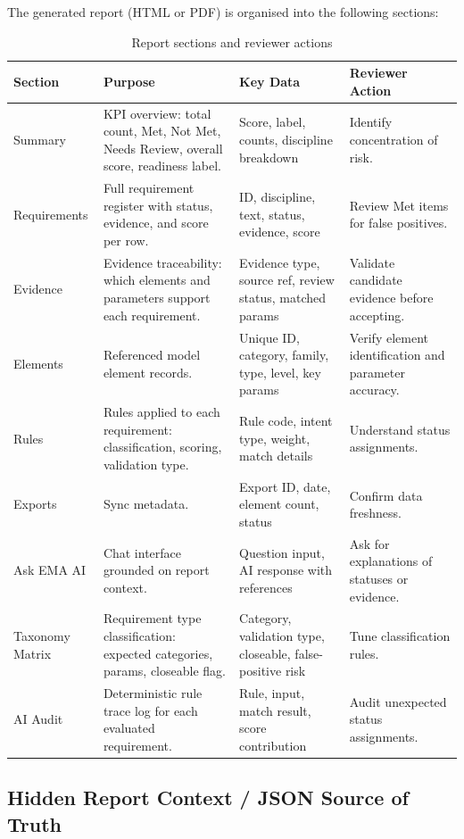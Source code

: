 \documentclass[10pt,letterpaper]{article}
\begin{document}
The generated report (HTML or PDF) is organised into the following sections:

\begin{longtable}{p{1.3in}p{1.6in}p{1.4in}p{2.0in}}
\caption{Report sections and reviewer actions}
\label{tab:report-sections}\\
\toprule
\textbf{Section} & \textbf{Purpose} & \textbf{Key Data} & \textbf{Reviewer Action} \\
\midrule
\endhead
Summary & KPI overview: total count, Met, Not Met, Needs Review, overall score, readiness label.
  & Score, label, counts, discipline breakdown & Identify concentration of risk. \\
Requirements & Full requirement register with status, evidence, and score per row.
  & ID, discipline, text, status, evidence, score & Review Met items for false positives. \\
Evidence & Evidence traceability: which elements and parameters support each requirement.
  & Evidence type, source ref, review status, matched params & Validate candidate evidence before
  accepting. \\
Elements & Referenced model element records. & Unique ID, category, family, type, level, key params
  & Verify element identification and parameter accuracy. \\
Rules & Rules applied to each requirement: classification, scoring, validation type.
  & Rule code, intent type, weight, match details & Understand status assignments. \\
Exports & Sync metadata. & Export ID, date, element count, status & Confirm data freshness. \\
Ask EMA AI & Chat interface grounded on report context. & Question input, AI response with
  references & Ask for explanations of statuses or evidence. \\
Taxonomy Matrix & Requirement type classification: expected categories, params, closeable flag.
  & Category, validation type, closeable, false-positive risk & Tune classification rules. \\
AI Audit & Deterministic rule trace log for each evaluated requirement.
  & Rule, input, match result, score contribution & Audit unexpected status assignments. \\
\bottomrule
\end{longtable}

\subsection{Hidden Report Context / JSON Source of Truth}
\end{document}

